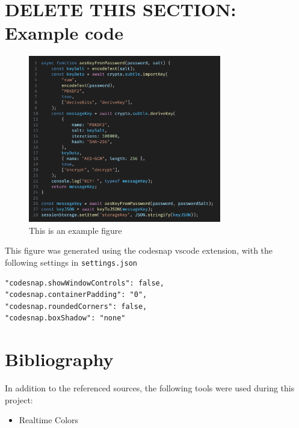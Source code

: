 \documentclass[12pt]{article}
\begin{document}
\newpage
\section{DELETE THIS SECTION: Example code}

\begin{figure}[h]
    \caption{This is an example figure}
    \centering
    \includegraphics[width=0.75\textwidth]{oldAesFromPassword.png}
\end{figure}

This figure was generated using the codesnap \cite{CodeSnap} vscode extension, with the following settings in \texttt{settings.json}

\begin{verbatim}
"codesnap.showWindowControls": false,
"codesnap.containerPadding": "0",
"codesnap.roundedCorners": false,
"codesnap.boxShadow": "none"
\end{verbatim}

\newpage
\section{Bibliography}

In addition to the referenced sources, the following tools were used during this project:

\begin{itemize}
    \item Realtime Colors \cite{rt-colors}
\end{itemize}



\end{document}
